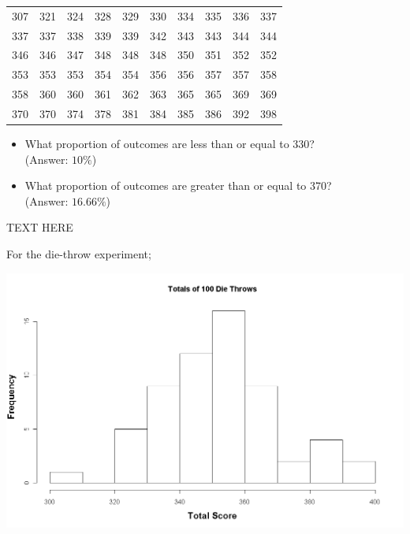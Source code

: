 \documentclass[12pt]{report}
\begin{document}
	
	\small
	\begin{center}
		\begin{tabular}{|c c c c c c c c c c|}
			\hline
			307 & 321 & 324 & 328 & 329 & 330 & 334 & 335 & 336 &337 \\
			337 & 337 & 338 & 339 & 339 & 342 & 343 & 343 & 344 &344 \\
			346 & 346 & 347 & 348 & 348 & 348 & 350 & 351 & 352 &352 \\
			353 & 353 & 353 & 354 & 354 & 356 & 356 & 357 & 357 &358 \\
			358 & 360 & 360 & 361 & 362 & 363 & 365 & 365 & 369 &369 \\
			370 & 370 & 374 & 378 & 381 & 384 & 385 & 386 & 392 &398 \\
			\hline
		\end{tabular}
	\end{center}
	\normalsize
	\begin{itemize}
		\item What proportion of outcomes are less than or equal to 330? \\ (Answer: $10\%$)
		\item What proportion of outcomes are greater than or equal to 370?\\ (Answer: $16.66\%$)
	\end{itemize}
	
	
	TEXT HERE
	
	
	For the die-throw experiment;
	\begin{center}
		\includegraphics[scale=0.30]{images/3aDieHist}
	\end{center}
	
\end{document}
